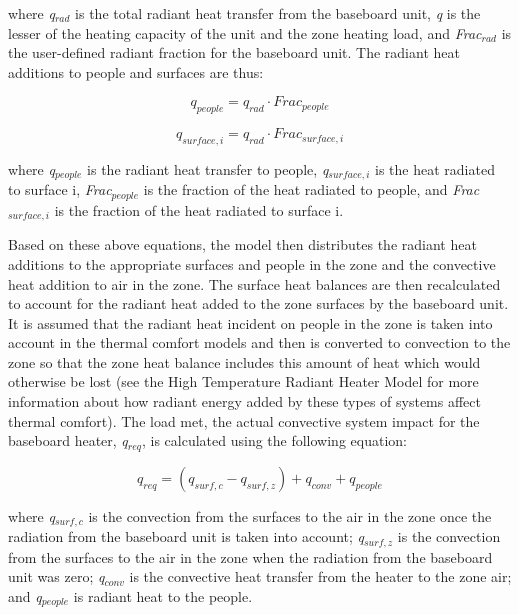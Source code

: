 where \emph{q\(_{rad}\)} is the total radiant heat transfer from the baseboard unit, \emph{q} is the lesser of the heating capacity of the unit and the zone heating load, and \emph{Frac\(_{rad}\)} is the user-defined radiant fraction for the baseboard unit. The radiant heat additions to people and surfaces are thus:

\begin{equation}
{q_{people}} = {q_{rad}} \cdot Fra{c_{people}}
\end{equation}

\begin{equation}
{q_{surface,i}} = {{q_{rad}} \cdot Fra{c_{surface,i}}}
\end{equation}

where \emph{q\(_{people}\)} is the radiant heat transfer to people, \emph{q\(_{surface,i}\)} is the heat radiated to surface i, \emph{Frac\(_{people}\)} is the fraction of the heat radiated to people, and \emph{Frac\(_{surface,i}\)} is the fraction of the heat radiated to surface i.

Based on these above equations, the model then distributes the radiant heat additions to the appropriate surfaces and people in the zone and the convective heat addition to air in the zone. The surface heat balances are then recalculated to account for the radiant heat added to the zone surfaces by the baseboard unit. It is assumed that the radiant heat incident on people in the zone is taken into account in the thermal comfort models and then is converted to convection to the zone so that the zone heat balance includes this amount of heat which would otherwise be lost (see the High Temperature Radiant Heater Model for more information about how radiant energy added by these types of systems affect thermal comfort). The load met, the actual convective system impact for the baseboard heater, \emph{q\(_{req}\)}, is calculated using the following equation:

\begin{equation}
{q_{req}} = ({q_{surf,c}} - {q_{surf,z}}) + {q_{conv}} + {q_{people}}
\end{equation}

where \emph{q\(_{surf,c}\)} is the convection from the surfaces to the air in the zone once the radiation from the baseboard unit is taken into account; \emph{q\(_{surf,z}\)} is the convection from the surfaces to the air in the zone when the radiation from the baseboard unit was zero; \emph{q\(_{conv}\)} is the convective heat transfer from the heater to the zone air; and \emph{q\(_{people}\)} is radiant heat to the people.

